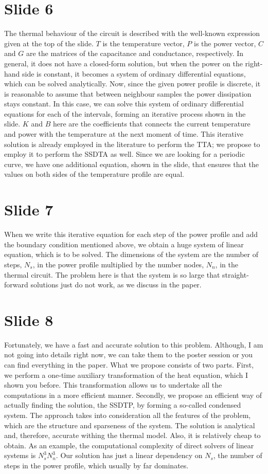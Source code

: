 \documentclass[11pt,a4paper]{article}
\begin{document}
\section{Slide 6}
The thermal behaviour of the circuit is described with the well-known expression given at the top of the slide. $T$ is the temperature vector, $P$ is the power vector, $C$ and $G$ are the matrices of the capacitance and conductance, respectively. In general, it does not have a closed-form solution, but when the power on the right-hand side is constant, it becomes a system of ordinary differential equations, which can be solved analytically. Now, since the given power profile is discrete, it is reasonable to assume that between neighbour samples the power dissipation stays constant. In this case, we can solve this system of ordinary differential equations for each of the intervals, forming an iterative process shown in the slide. $K$ and $B$ here are the coefficients that connects the current temperature and power with the temperature at the next moment of time. This iterative solution is already employed in the literature to perform the TTA; we propose to employ it to perform the SSDTA as well. Since we are looking for a periodic curve, we have one additional equation, shown in the slide, that ensures that the values on both sides of the temperature profile are equal.

\section{Slide 7}
When we write this iterative equation for each step of the power profile and add the boundary condition mentioned above, we obtain a huge system of linear equation, which is to be solved. The dimensions of the system are the number of steps, $N_s$, in the power profile multiplied by the number nodes, $N_n$, in the thermal circuit. The problem here is that the system is so large that straight-forward solutions just do not work, as we discuss in the paper.

\section{Slide 8}
Fortunately, we have a fast and accurate solution to this problem. Although, I am not going into details right now, we can take them to the poster session or you can find everything in the paper. What we propose consists of two parts. First, we perform a one-time auxiliary transformation of the heat equation, which I shown you before. This transformation allows us to undertake all the computations in a more efficient manner. Secondly, we propose an efficient way of actually finding the solution, the SSDTP, by forming a so-called condensed system. The approach takes into consideration all the features of the problem, which are the structure and sparseness of the system. The solution is analytical and, therefore, accurate withing the thermal model. Also, it is relatively cheap to obtain. As an example, the computational complexity of direct solvers of linear systems is $N_s^3 N_n^3$. Our solution has just a linear dependency on $N_s$, the number of steps in the power profile, which usually by far dominates.
\end{document}
